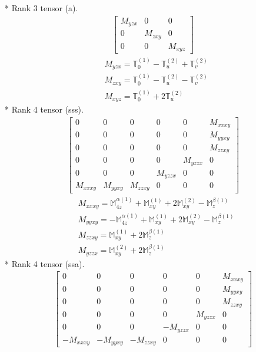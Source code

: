 \documentclass[fleqn,8pt,landscape]{jsarticle}
\begin{document}
* Rank 3 tensor (a).
\begin{align*}
\begin{bmatrix} M_{yzx} & 0 & 0 \\ 0 & M_{zxy} & 0 \\ 0 & 0 & M_{xyz} \end{bmatrix}
\end{align*}
\begin{align*}
& M_{yzx} = \mathbb{T}_{0}^{(1)} - \mathbb{T}_{u}^{(2)} + \mathbb{T}_{v}^{(2)} \\
& M_{zxy} = \mathbb{T}_{0}^{(1)} - \mathbb{T}_{u}^{(2)} - \mathbb{T}_{v}^{(2)} \\
& M_{xyz} = \mathbb{T}_{0}^{(1)} + 2 \mathbb{T}_{u}^{(2)}
\end{align*}
* Rank 4 tensor (sss).
\begin{align*}
\begin{bmatrix} 0 & 0 & 0 & 0 & 0 & M_{xxxy} \\ 0 & 0 & 0 & 0 & 0 & M_{yyxy} \\ 0 & 0 & 0 & 0 & 0 & M_{zzxy} \\ 0 & 0 & 0 & 0 & M_{yzzx} & 0 \\ 0 & 0 & 0 & M_{yzzx} & 0 & 0 \\ M_{xxxy} & M_{yyxy} & M_{zzxy} & 0 & 0 & 0 \end{bmatrix}
\end{align*}
\begin{align*}
& M_{xxxy} = \mathbb{M}_{4z}^{\alpha(1)} + \mathbb{M}_{xy}^{(1)} + 2 \mathbb{M}_{xy}^{(2)} - \mathbb{M}_{z}^{\beta(1)} \\
& M_{yyxy} = - \mathbb{M}_{4z}^{\alpha(1)} + \mathbb{M}_{xy}^{(1)} + 2 \mathbb{M}_{xy}^{(2)} - \mathbb{M}_{z}^{\beta(1)} \\
& M_{zzxy} = \mathbb{M}_{xy}^{(1)} + 2 \mathbb{M}_{z}^{\beta(1)} \\
& M_{yzzx} = \mathbb{M}_{xy}^{(2)} + 2 \mathbb{M}_{z}^{\beta(1)}
\end{align*}
* Rank 4 tensor (ssa).
\begin{align*}
\begin{bmatrix} 0 & 0 & 0 & 0 & 0 & M_{xxxy} \\ 0 & 0 & 0 & 0 & 0 & M_{yyxy} \\ 0 & 0 & 0 & 0 & 0 & M_{zzxy} \\ 0 & 0 & 0 & 0 & M_{yzzx} & 0 \\ 0 & 0 & 0 & - M_{yzzx} & 0 & 0 \\ - M_{xxxy} & - M_{yyxy} & - M_{zzxy} & 0 & 0 & 0 \end{bmatrix}
\end{align*}
\end{document}
